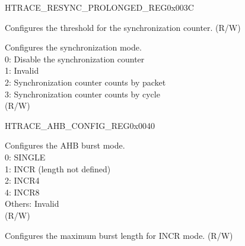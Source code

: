 \begin{register}{H}{TRACE\_RESYNC\_PROLONGED\_REG}{0x003C}\label{regdesc:TRACERESYNCPROLONGEDREG}
%
%
%
\regnewline%
\begin{regdesc}\begin{reglist}
\label{fielddesc:TRACERESYNCPROLONGED}\item [TRACE\_RESYNC\_PROLONGED] Configures the threshold for the synchronization counter. (R/W)
\label{fielddesc:TRACERESYNCMODE}\item [TRACE\_RESYNC\_MODE] Configures the synchronization mode.\\
0: Disable the synchronization counter\\
1: Invalid\\
2: Synchronization counter counts by packet\\
3: Synchronization counter counts by cycle\\
 (R/W)
\end{reglist}\end{regdesc}
\end{register}


\begin{register}{H}{TRACE\_AHB\_CONFIG\_REG}{0x0040}\label{regdesc:TRACEAHBCONFIGREG}
%
%
%
\regnewline%
\begin{regdesc}\begin{reglist}
\label{fielddesc:TRACEHBURST}\item [TRACE\_HBURST] Configures the AHB burst mode.\\
0: SINGLE\\
1: INCR (length not defined)\\
2: INCR4\\
4: INCR8\\
Others: Invalid\\ (R/W)
\label{fielddesc:TRACEMAXINCR}\item [TRACE\_MAX\_INCR] Configures the maximum burst length for INCR mode. (R/W)
\end{reglist}\end{regdesc}
\end{register}


